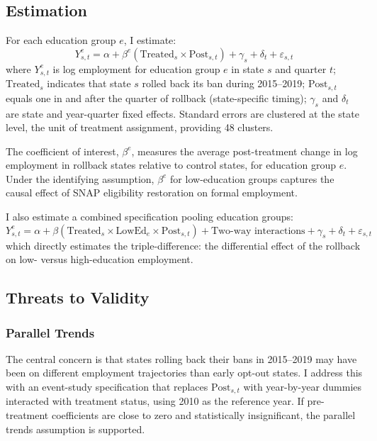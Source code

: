 \documentclass[12pt]{article}
\begin{document}
\subsection{Estimation}

For each education group $e$, I estimate:
\begin{equation}
\label{eq:did}
Y_{s,t}^{e} = \alpha + \beta^{e} \left(\text{Treated}_{s} \times \text{Post}_{s,t}\right) + \gamma_{s} + \delta_{t} + \varepsilon_{s,t}
\end{equation}
where $Y_{s,t}^{e}$ is log employment for education group $e$ in state $s$ and quarter $t$; $\text{Treated}_{s}$ indicates that state $s$ rolled back its ban during 2015--2019; $\text{Post}_{s,t}$ equals one in and after the quarter of rollback (state-specific timing); $\gamma_{s}$ and $\delta_{t}$ are state and year-quarter fixed effects. Standard errors are clustered at the state level, the unit of treatment assignment, providing 48 clusters.

The coefficient of interest, $\beta^{e}$, measures the average post-treatment change in log employment in rollback states relative to control states, for education group $e$. Under the identifying assumption, $\beta^{e}$ for low-education groups captures the causal effect of SNAP eligibility restoration on formal employment.

I also estimate a combined specification pooling education groups:
\begin{equation}
\label{eq:combined}
Y_{s,t}^{e} = \alpha + \beta \left(\text{Treated}_{s} \times \text{LowEd}_{e} \times \text{Post}_{s,t}\right) + \text{Two-way interactions} + \gamma_{s} + \delta_{t} + \varepsilon_{s,t}
\end{equation}
which directly estimates the triple-difference: the differential effect of the rollback on low- versus high-education employment.

\subsection{Threats to Validity}

\subsubsection*{Parallel Trends} The central concern is that states rolling back their bans in 2015--2019 may have been on different employment trajectories than early opt-out states. I address this with an event-study specification that replaces $\text{Post}_{s,t}$ with year-by-year dummies interacted with treatment status, using 2010 as the reference year. If pre-treatment coefficients are close to zero and statistically insignificant, the parallel trends assumption is supported.
\end{document}
